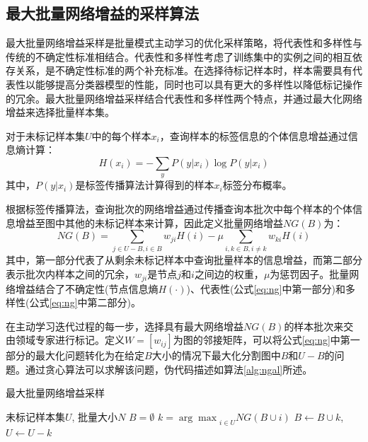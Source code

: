\subsection{最大批量网络增益的采样算法}
最大批量网络增益采样是批量模式主动学习的优化采样策略，将代表性和多样性与传统的不确定性标准相结合。代表性和多样性考虑了训练集中的实例之间的相互依存关系，是不确定性标准的两个补充标准。在选择待标记样本时，样本需要具有代表性以能够提高分类器模型的性能，同时也可以具有更大的多样性以降低标记操作的冗余。最大批量网络增益采样结合代表性和多样性两个特点，并通过最大化网络增益来选择批量样本集。

对于未标记样本集$U$中的每个样本$x_{i}$，查询样本的标签信息的个体信息增益通过信息熵计算：
\begin{equation}
H(x_{i})=-\sum_{y}P(y|x_{i})\log P(y|x_{i})
\end{equation}
其中，$P(y|x_{i})$是标签传播算法计算得到的样本$x_{i}$标签分布概率。

根据标签传播算法，查询批次的网络增益通过传播查询本批次中每个样本的个体信息增益至图中其他的未标记样本来计算，因此定义批量网络增益$NG(B)$为：
\begin{equation}
\label{eq:ng}
NG(B)=\sum_{j \in U-B,i \in B}w_{ji}H(i)-\mu \sum_{i,k \in B,i \neq k}w_{ki}H(i)
\end{equation}
其中，第一部分代表了从剩余未标记样本中查询批量样本的信息增益，而第二部分表示批次内样本之间的冗余，$w_{ji}$是节点$j$和$i$之间边的权重，$\mu$为惩罚因子。批量网络增益结合了不确定性(节点信息熵$H(\cdot)$)、代表性(公式\ref{eq:ng}中第一部分)和多样性(公式\ref{eq:ng}中第二部分)。

在主动学习迭代过程的每一步，选择具有最大网络增益$NG(B)$的样本批次来交由领域专家进行标记。定义$W=[w_{ij}]$为图的邻接矩阵，可以将公式\ref{eq:ng}中第一部分的最大化问题转化为在给定$B$大小的情况下最大化分割图中$B$和$U-B$的问题。通过贪心算法可以求解该问题，伪代码描述如算法\ref{alg:ngal}所述。
\begin{algorithm}
\caption{最大批量网络增益采样}
\label{alg:ngal}
\begin{algorithmic}
\Input 未标记样本集$U$, 批量大小$N$
\State $B=\emptyset $  
\Repeat
\State $k={\arg\max}_{i \in U}{NG(B\cup {i})}$
\State $B\leftarrow B\cup {k}$, $U\leftarrow U-{k}$
\end{algorithmic}
\end{algorithm}


